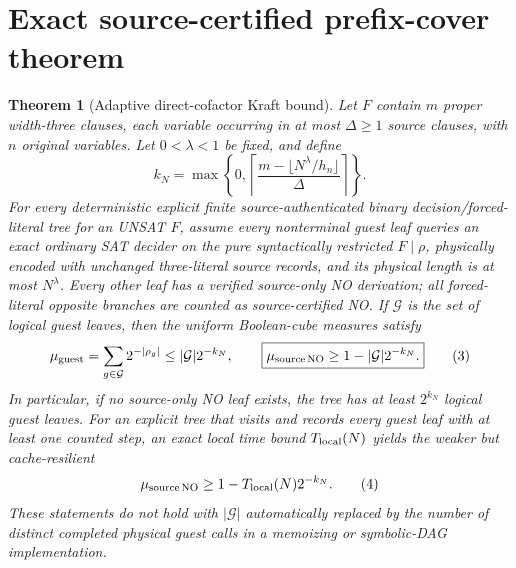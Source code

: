 \documentclass[11pt]{article}
\newtheorem{theorem}{Theorem}
\begin{document}
\section{Exact source-certified prefix-cover theorem}
\begin{theorem}[Adaptive direct-cofactor Kraft bound]\label{th:main}
Let $F$ contain $m$ proper width-three clauses, each variable occurring in
at most $\Delta\ge1$ source clauses, with $n$ original variables. Let
$0<\lambda<1$ be fixed, and define
\[
 k_N=\max\left\{0,\left\lceil
 \frac{m-\lfloor N^\lambda/h_n\rfloor}{\Delta}
 \right\rceil\right\}.                                           \tag{2}
\]
For every deterministic \emph{explicit finite} source-authenticated
binary decision/forced-literal tree for an \emph{UNSAT} $F$, assume every
nonterminal guest leaf queries an exact ordinary SAT decider on the pure
syntactically restricted $F\mid\rho$, physically encoded with unchanged
three-literal source records, and its physical length is at most
$N^\lambda$. Every other leaf has a verified source-only NO derivation;
all forced-literal opposite branches are counted as source-certified NO.
If $\mathcal G$ is the set of \emph{logical guest leaves}, then the
uniform Boolean-cube measures satisfy
\[
 \mu_{\rm guest}=\sum_{g\in\mathcal G}2^{-|\rho_g|}
 \le |\mathcal G|2^{-k_N},\qquad
 \boxed{\mu_{\rm source\,NO}\ge1-|\mathcal G|2^{-k_N}.}            \tag{3}
\]
In particular, if no source-only NO leaf exists, the tree has at least
$2^{k_N}$ logical guest leaves. For an explicit tree that visits and records
every guest leaf with at least one counted step, an exact local time bound
$T_{\rm local}(N)$ yields the weaker but cache-resilient
\[
 \mu_{\rm source\,NO}\ge1-T_{\rm local}(N)2^{-k_N}.     \tag{4}
\]
These statements do not hold with $|\mathcal G|$ automatically replaced by
the number of \emph{distinct completed physical guest calls} in a memoizing
or symbolic-DAG implementation.
\end{theorem}
\end{document}
